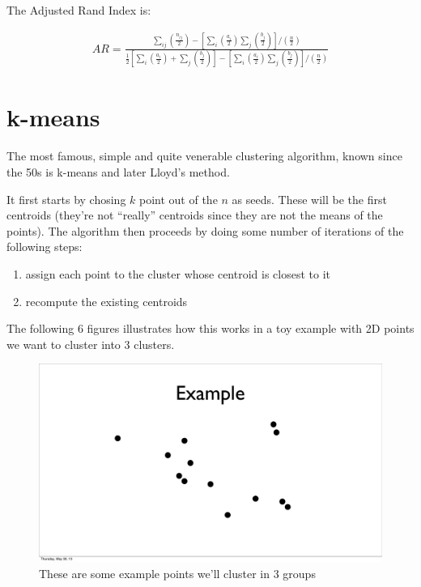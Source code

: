 \documentclass{article}
\begin{document}
The Adjusted Rand Index is:

\begin{eqnarray}
    AR = \frac{\sum_{ij} \left( \frac{n_{ij}}{2} \right) - \left[\sum_i
        \left( \frac{a_i}{2} \right) \sum_j \left( \frac{b_j}{2} \right)
        \right]/\left( \frac{n}{2} \right)}{\frac{1}{2} \left[ \sum_i \left(
            \frac{a_i}{2} \right) + \sum_j \left( \frac{b_j}{2} \right) \right] - \left[\sum_i
        \left( \frac{a_i}{2} \right) \sum_j \left( \frac{b_j}{2} \right)
        \right]/\left( \frac{n}{2} \right)}
\end{eqnarray}

\section{k-means}

The most famous, simple and quite venerable clustering algorithm, known since the 50s
is k-means and later Lloyd's method.

It first starts by chosing $k$ point out of the $n$ as seeds. These will be the
first centroids (they're not ``really'' centroids since they are not the means
of the points).
The algorithm then proceeds by doing some number of iterations of the following
steps:
\begin{enumerate}
    \item assign each point to the cluster whose centroid is closest to it
    \item recompute the existing centroids
\end{enumerate}
The following 6 figures illustrates how this works in a toy example with 2D
points we want to cluster into 3 clusters.

\begin{figure}[H]
    \caption{These are some example points we'll cluster in 3 groups}
    \includegraphics[scale=0.4]{kmeans-points-pre.pdf}
\end{figure}
\end{document}

